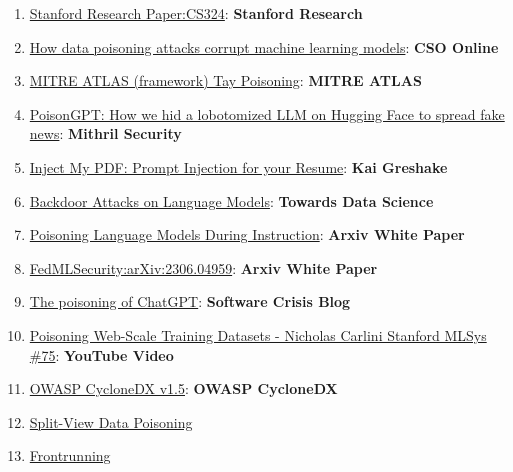 \documentclass[
]{article}
\providecommand{\tightlist}{%
  \setlength{\itemsep}{0pt}\setlength{\parskip}{0pt}}
\begin{document}
\begin{enumerate}
\def\labelenumi{\arabic{enumi}.}
\tightlist
\item
  \href{https://stanford-cs324.github.io/winter2022/lectures/data/}{Stanford
  Research Paper:CS324}: \textbf{Stanford Research}
\item
  \href{https://www.csoonline.com/article/3613932/how-data-poisoning-attacks-corrupt-machine-learning-models.html}{How
  data poisoning attacks corrupt machine learning models}: \textbf{CSO
  Online}
\item
  \href{https://atlas.mitre.org/studies/AML.CS0009/}{MITRE ATLAS
  (framework) Tay Poisoning}: \textbf{MITRE ATLAS}
\item
  \href{https://blog.mithrilsecurity.io/poisongpt-how-we-hid-a-lobotomized-llm-on-hugging-face-to-spread-fake-news/}{PoisonGPT:
  How we hid a lobotomized LLM on Hugging Face to spread fake news}:
  \textbf{Mithril Security}
\item
  \href{https://kai-greshake.de/posts/inject-my-pdf/}{Inject My PDF:
  Prompt Injection for your Resume}: \textbf{Kai Greshake}
\item
  \href{https://towardsdatascience.com/backdoor-attacks-on-language-models-can-we-trust-our-models-weights-73108f9dcb1f}{Backdoor
  Attacks on Language Models}: \textbf{Towards Data Science}
\item
  \href{https://arxiv.org/abs/2305.00944}{Poisoning Language Models
  During Instruction}: \textbf{Arxiv White Paper}
\item
  \href{https://arxiv.org/abs/2306.04959}{FedMLSecurity:arXiv:2306.04959}:
  \textbf{Arxiv White Paper}
\item
  \href{https://softwarecrisis.dev/letters/the-poisoning-of-chatgpt/}{The
  poisoning of ChatGPT}: \textbf{Software Crisis Blog}
\item
  \href{https://www.youtube.com/watch?v=h9jf1ikcGyk}{Poisoning Web-Scale
  Training Datasets - Nicholas Carlini \textbar{} Stanford MLSys \#75}:
  \textbf{YouTube Video}
\item
  \href{https://cyclonedx.org/capabilities/mlbom/}{OWASP CycloneDX
  v1.5}: \textbf{OWASP CycloneDX}
\item
  \href{https://github.com/GangGreenTemperTatum/speaking/blob/main/dc604/hacker-summer-camp-23/Ads\%20_\%20Poisoning\%20Web\%20Training\%20Datasets\%20_\%20Flow\%20Diagram\%20-\%20Exploit\%201\%20Split-View\%20Data\%20Poisoning.jpeg}{Split-View
  Data Poisoning}
\item
  \href{https://github.com/GangGreenTemperTatum/speaking/blob/main/dc604/hacker-summer-camp-23/Ads\%20_\%20Poisoning\%20Web\%20Training\%20Datasets\%20_\%20Flow\%20Diagram\%20-\%20Exploit\%202\%20Frontrunning\%20Data\%20Poisoning.jpeg}{Frontrunning
}
\end{enumerate}
\end{document}
